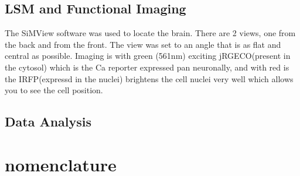     \subsection{LSM and Functional Imaging}
    The SiMView software was used to locate the brain. There are 2 views, one from the back and from the front. The view was set to an angle that is as flat and central as possible. Imaging is with green (561nm) exciting jRGECO(present in the cytosol) which is the Ca reporter expressed pan neuronally, and with red is the IRFP(expressd in the nuclei) brightens the cell nuclei very well which allows you to see the cell position. 
    \subsection{Data Analysis}

\section{nomenclature} 
    \label{nomenclature}

